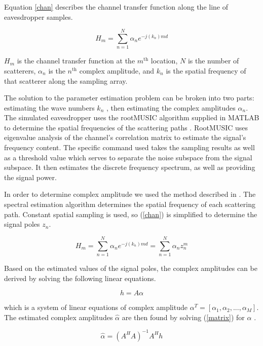 \documentclass{allertonproc}
\begin{document}
Equation \ref{chan} describes the channel transfer function along the line of eavesdropper samples.

\begin{equation}\label{chan}
H_m= \sum_{n=1}^N \alpha_n e^{-j(k_n)md}
\end{equation}

 $H_m$ is the channel transfer function at the $m^{\mathrm{th}}$ location, $N$ is the number of scatterers, $\alpha_n$ is the $n^{\mathrm{th}}$ complex amplitude, and $k_n$ is the spatial frequency of that scatterer along the sampling array.  

The solution to the parameter estimation problem can be broken into two parts: estimating the wave numbers $k_n$ , then estimating the complex amplitudes $\alpha_n$. The simulated eavesdropper uses the rootMUSIC algorithm supplied in MATLAB to determine the spatial frequencies of the scattering paths \cite{matlab}. RootMUSIC uses eigenvalue analysis of the channel's correlation matrix to estimate the signal's frequency content. The specific command used takes the sampling results as well as a threshold value which serves to separate the noise subspace from the signal subspace. It then estimates the discrete frequency spectrum, as well as providing the signal power. 

In order to determine complex amplitude we used the method described in \cite{andersen1999}. The spectral estimation algorithm determines the spatial frequency of each scattering path. Constant spatial sampling is used, so (\ref{chan}) is simplified to determine the signal poles $z_n$.

\begin{equation}\label{complexamp}
H_m = \sum_{n=1}^N \alpha_n e^{-j(k_n)md} = \sum_{n=1}^N \alpha_n z_n^m
\end{equation}

Based on the estimated values of the signal poles, the complex amplitudes can be derived by solving the following linear equations.

\begin{equation}\label{matrix}
h = A \alpha
\end{equation}

which is a system of linear equations of complex amplitude $\alpha^T = [\alpha_1, \alpha_2,... ,\alpha_M]$. The estimated complex amplitudes $\hat{\alpha}$ are then found by solving (\ref{matrix}) for $\alpha$ \cite{andersen1999}.

\begin{equation}\label{ahat}
\hat{\alpha}=(A^HA)^{-1}A^Hh
\end{equation}
\end{document}
